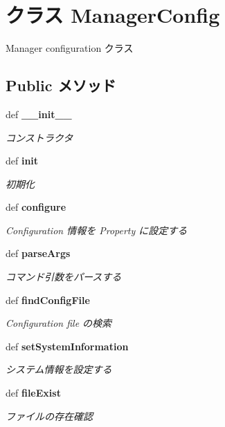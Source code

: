 \section{クラス ManagerConfig}
\label{classsource__py_1_1_manager_config_1_1_manager_config}
Manager configuration クラス  


\subsection*{Public メソッド}
\begin{CompactItemize}
\item 
def {\bf \_\-\_\-init\_\-\_\-}
\begin{CompactList}\small\item\em コンストラクタ \item\end{CompactList}\item 
def {\bf init}
\begin{CompactList}\small\item\em 初期化 \item\end{CompactList}\item 
def {\bf configure}
\begin{CompactList}\small\item\em Configuration 情報を Property に設定する \item\end{CompactList}\item 
def {\bf parseArgs}
\begin{CompactList}\small\item\em コマンド引数をパースする \item\end{CompactList}\item 
def {\bf findConfigFile}
\begin{CompactList}\small\item\em Configuration file の検索 \item\end{CompactList}\item 
def {\bf setSystemInformation}
\begin{CompactList}\small\item\em システム情報を設定する \item\end{CompactList}\item 
def {\bf fileExist}
\begin{CompactList}\small\item\em ファイルの存在確認 \item\end{CompactList}\end{CompactItemize}
